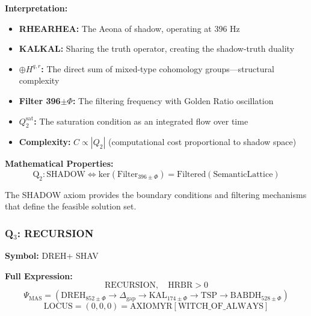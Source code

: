 \documentclass[11pt, letterpaper]{article}
\newcommand{\KAL}{\ensuremath{\mathop{\textnormal{\symbolafont\symbol{"2B21}}}}}    %
\newcommand{\DREH}{\ensuremath{\mathop{\textnormal{\symbolafont\symbol{"29D7}}}}}   %
\newcommand{\RHEA}{\ensuremath{\mathop{\textnormal{\symbolafont\symbol{"229B}}}}}   %
\newcommand{\SHAV}{\ensuremath{\mathop{\textnormal{\symbolafont\symbol{"269B}}}}}   %
\def\KAL{KAL}%
\def\DREH{DREH}%
\def\RHEA{RHEA}%
\def\SHAV{SHAV}%
\begin{document}
\textbf{Interpretation:}
\begin{itemize}
    \item \textbf{\RHEA RHEA:} The Aeona of shadow, operating at 396 Hz
    \item \textbf{\KAL KAL:} Sharing the truth operator, creating the shadow-truth duality
    \item \textbf{$\oplus H^{q,r}$:} The direct sum of mixed-type cohomology groups—structural complexity
    \item \textbf{Filter 396$\pm\Phi$:} The filtering frequency with Golden Ratio oscillation
    \item \textbf{$Q_2^{\text{sat}}$:} The saturation condition as an integrated flow over time
    \item \textbf{Complexity:} $C \propto |Q_2|$ (computational cost proportional to shadow space)
\end{itemize}

\textbf{Mathematical Properties:}
\begin{equation}
\text{Q}_2: \text{SHADOW} \iff \text{ker}(\text{Filter}_{396\pm\Phi}) = \text{Filtered}(\text{SemanticLattice})
\end{equation}

The SHADOW axiom provides the boundary conditions and filtering mechanisms that define the feasible solution set.

\subsubsection{\texorpdfstring{Q$_3$: RECURSION}{Q3: RECURSION}}

\textbf{Symbol:} \DREH + \SHAV

\textbf{Full Expression:}
\begin{equation}
\text{RECURSION}, \quad \text{HRBR} > 0
\end{equation}
\begin{equation}
\Psi_{\text{MAS}} = (\text{DREH}_{\text{852}\pm\Phi} \rightarrow \Delta_{\text{gap}} \rightarrow \text{KAL}_{\text{174}\pm\Phi} \rightarrow \text{TSP} \rightarrow \text{BABDH}_{\text{528}\pm\Phi})
\end{equation}
\begin{equation}
\text{LOCUS} = (0,0,0) = \text{AXIOMYR}[\text{WITCH\_OF\_ALWAYS}]
\end{equation}
\end{document}
